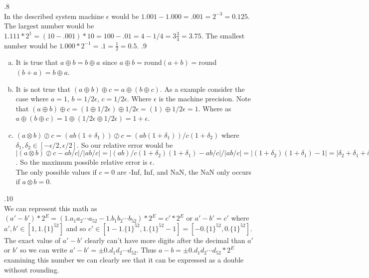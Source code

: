 \documentclass[12pt]{article}
\makeatletter
\theoremstyle{homework}
\newenvironment{exercise}[1]
{\def\@currentlabel{#1}\exercisecore}
{\endexercisecore}
\makeatother
\begin{document}
\begin{exercise}

5.8\\
\end{exercise}
In the described system machine $\epsilon$ would be $1.001-1.000=.001=2^{-3}=0.125$.  The largest number would be $1.111*2^1=(10-.001)*10=100-.01=4-1/4=3\frac{3}{4}=3.75$.  The smallest number would be $1.000*2^{-1}=.1=\frac{1}{2}=0.5$.
\begin{exercise}

5.9\\
\end{exercise}
\begin{enumerate}[(a)]
\item
It is true that $a\oplus b=b\oplus a$ since $a\oplus b=$round$(a+b)=$round$(b+a)=b\oplus a$.
\item
It is not true that $(a\oplus b)\oplus c=a\oplus (b\oplus c)$.  As a example consider the case where $a=1$, $b= 1/2\epsilon$, $c= 1/2\epsilon$.  Where $\epsilon$ is the machine precision.  Note that $(a\oplus b)\oplus c=(1\oplus 1/2\epsilon)\oplus 1/2\epsilon=(1)\oplus 1/2\epsilon=1$.  Where as $a\oplus (b\oplus c)=1\oplus (1/2\epsilon \oplus 1/2\epsilon)=1+\epsilon$.
\item
$(a\otimes b)\oslash c=(ab(1+\delta_1))\oslash c=(ab(1+\delta_1))/c(1+\delta_2)$ where $\delta_1,\delta_2\in[-\epsilon/2,\epsilon/2]$.  So our relative error would be $|(a\otimes b)\oslash c-ab/c|/|ab/c|=|(ab)/c(1+\delta_2)(1+\delta_1)-ab/c|/|ab/c|=|(1+\delta_2)(1+\delta_1)-1|=|\delta_2+\delta_1+\delta_2\delta_1|\approx|\delta_2+\delta_1|\leq \epsilon$.  So the maximum possible relative error is $\epsilon$.\\
The only possible values if $c=0$ are -Inf, Inf, and NaN, the NaN only occurs if $a\otimes b=0$.
\end{enumerate}
\begin{exercise}

5.10\\
\end{exercise}
We can represent this math as $(a'-b')*2^E=(1.a_1a_2\cdots a_{52}-1.b_1b_2\cdots b_{52})*2^E=c'*2^E$ or $a'-b'=c'$ where $a',b'\in[1,1.\{1\}^{52}]$ and so $c'\in[1-1.\{1\}^{52},1.\{1\}^{52}-1]=[-0.\{1\}^{52},0.\{1\}^{52}]$.  The exact value of $a'-b'$ clearly can't have more digits after the decimal than $a'$ or $b'$ so we can write $a'-b'=\pm 0.d_1d_2\cdots d_{52}$.  Thus $a-b=\pm 0.d_1d_2\cdots d_{52}*2^E$ examining this number we can clearly see that it can be expressed as a double without rounding.
\end{document}
